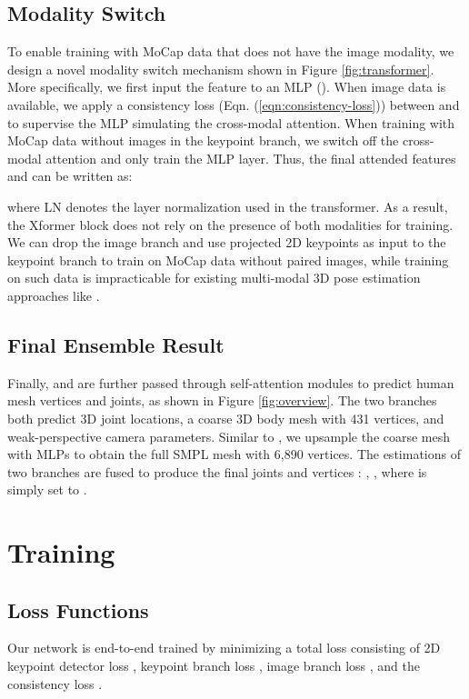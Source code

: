 \documentclass{article}
\begin{document}
\subsection{Modality Switch}
\label{sec:modalityswitch}
To enable training with MoCap data that does not have the image modality, we design a novel 
modality switch
mechanism shown in Figure \ref{fig:transformer}. More specifically, we first input the feature  to an MLP (). When image data is available, we apply a consistency loss (Eqn. (\ref{eqn:consistency-loss})) between  and  to supervise the MLP simulating the cross-modal attention. When training with MoCap data without images in the keypoint branch, we switch off the cross-modal attention and only train the MLP layer. Thus, the final attended features  and  can be written as:


where LN denotes the layer normalization used in the transformer.
As a result, the Xformer block does not rely on the presence of both modalities for training. We can drop the image branch and use projected 2D keypoints as input to the keypoint branch to train on MoCap data without paired images, while training on such data is impracticable for existing multi-modal 3D pose estimation approaches like \cite{VNect_SIGGRAPH2017,mehta2020xnect,tekin2017learning,sun2019human}. 

\subsection{Final Ensemble Result}
\label{sec:ensemble}
Finally,  and  are further passed through self-attention modules to predict human mesh vertices and joints, as shown in Figure \ref{fig:overview}. 
The two branches both predict 3D joint locations, a coarse 3D body mesh with 431 vertices, and weak-perspective camera parameters. Similar to \cite{lin2020end,lin2021-mesh-graphormer}, we upsample the coarse mesh with MLPs to obtain the full SMPL mesh with 6,890 vertices. The estimations of two branches are fused to produce the final joints  and vertices : , , where  is simply set to .

\section{Training}

\subsection{Loss Functions}
\label{sec:loss-function}
Our network is end-to-end trained by minimizing a total loss  consisting of 2D keypoint detector loss , keypoint branch loss , image branch loss , and the consistency loss .
\end{document}
